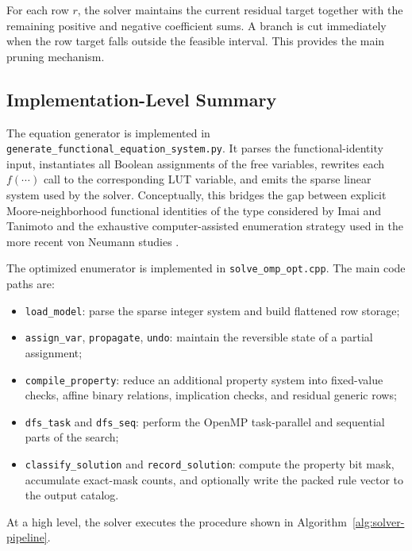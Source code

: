 \documentclass[11pt,a4paper]{article}
\newcommand{\F}[1]{f\!\left(#1\right)}
\begin{document}
For each row \(r\), the solver maintains the current residual target together with the
remaining positive and negative coefficient sums.  A branch is cut immediately when the row
target falls outside the feasible interval.  This provides the main pruning mechanism.

\subsection{Implementation-Level Summary}

The equation generator is implemented in
\texttt{generate\_functional\_equation\_system.py}.  It parses the functional-identity input,
instantiates all Boolean assignments of the free variables, rewrites each \(\F{\cdots}\) call
to the corresponding LUT variable, and emits the sparse linear system used by the solver.
Conceptually, this bridges the gap between explicit Moore-neighborhood functional identities of
the type considered by Imai and Tanimoto \cite{TanimotoImai2008} and the exhaustive
computer-assisted enumeration strategy used in the more recent von Neumann studies
\cite{DzedzejWolnikNencaBaetensDeBaets2020,DzedzejWolnikNencaBaetensDeBaets2021}.

The optimized enumerator is implemented in \texttt{solve\_omp\_opt.cpp}.  The main code paths are:
\begin{itemize}
\item \texttt{load\_model}: parse the sparse integer system and build flattened row storage;
\item \texttt{assign\_var}, \texttt{propagate}, \texttt{undo}: maintain the reversible state of
      a partial assignment;
\item \texttt{compile\_property}: reduce an additional property system into fixed-value checks,
      affine binary relations, implication checks, and residual generic rows;
\item \texttt{dfs\_task} and \texttt{dfs\_seq}: perform the OpenMP task-parallel and sequential
      parts of the search;
\item \texttt{classify\_solution} and \texttt{record\_solution}: compute the property bit mask,
      accumulate exact-mask counts, and optionally write the packed rule vector to the output
      catalog.
\end{itemize}

At a high level, the solver executes the procedure shown in Algorithm~\ref{alg:solver-pipeline}.
\end{document}

